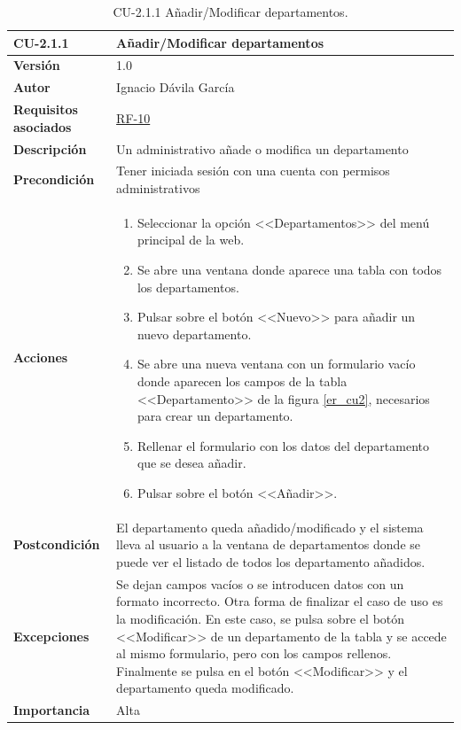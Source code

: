 \begin{table}[p]
\label{table:CU-2.1.1}
	\centering
	\begin{tabularx}{\linewidth}{ p{} p{} }
		\toprule
		\textbf{CU-2.1.1}    & \textbf{Añadir/Modificar departamentos}\\
		\toprule
		\textbf{Versión}              & 1.0    \\
		\textbf{Autor}                & Ignacio Dávila García \\
		\textbf{Requisitos asociados} & \hyperref[itm:RF10]{RF-10} \\
		\textbf{Descripción}          & Un administrativo añade o modifica un departamento \\
		\textbf{Precondición}         & Tener iniciada sesión con una cuenta con permisos administrativos \\
		\textbf{Acciones}             &
		\begin{enumerate}
			\def\labelenumi{\arabic{enumi}.}
			\tightlist
			\item Seleccionar la opción <<Departamentos>> del menú principal de la web.
			\item Se abre una ventana donde aparece una tabla con todos los departamentos.
			\item Pulsar sobre el botón <<Nuevo>> para añadir un nuevo departamento.
			\item Se abre una nueva ventana con un formulario vacío donde aparecen los campos de la tabla <<Departamento>> de la figura \ref{er_cu2}, necesarios para crear un departamento.
			\item Rellenar el formulario con los datos del departamento que se desea añadir.
			\item Pulsar sobre el botón <<Añadir>>.
		\end{enumerate}\\
		\textbf{Postcondición}        & El departamento queda añadido/modificado y el sistema lleva al usuario a la ventana de departamentos donde se puede ver el listado de todos los departamento añadidos. \\
		\textbf{Excepciones}          & Se dejan campos vacíos o se introducen datos con un formato incorrecto. Otra forma de finalizar el caso de uso es la modificación. En este caso, se pulsa sobre el botón <<Modificar>> de un departamento de la tabla y se accede al mismo formulario, pero con los campos rellenos. Finalmente se pulsa en el botón <<Modificar>> y el departamento queda modificado. \\
		\textbf{Importancia}          & Alta \\
		\bottomrule
	\end{tabularx}
	\caption{CU-2.1.1 Añadir/Modificar departamentos.}
\end{table}
\FloatBarrier

